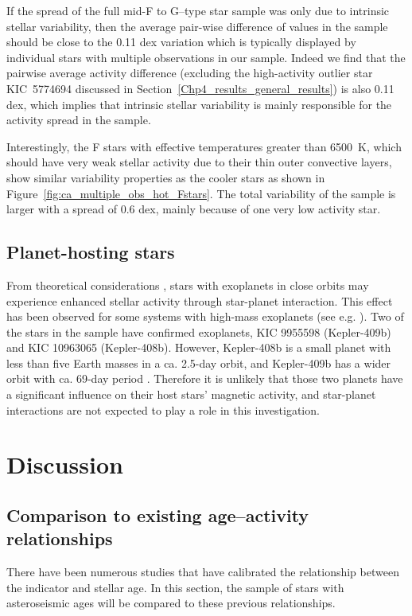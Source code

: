 If the spread of the full mid-F to G--type star sample was only due to intrinsic stellar variability, then the average pair-wise difference of \Rprime values in the sample should be close to the 0.11 dex variation which is typically displayed by individual stars with multiple observations in our sample. Indeed we find that the pairwise average activity difference (excluding the high-activity outlier star KIC~5774694 discussed in Section~\ref{Chp4_results_general_results}) is also 0.11 dex, which implies that intrinsic stellar variability is mainly responsible for the activity spread in the sample.

Interestingly, the F stars with effective temperatures greater than 6500~K, which should have very weak stellar activity due to their thin outer convective layers, show similar variability properties as the cooler stars as shown in Figure~\ref{fig:ca_multiple_obs_hot_Fstars}. The total variability of the sample is larger with a spread of 0.6 dex, mainly because of one very low activity star. 

\subsection{Planet-hosting stars}
From theoretical considerations \citep{Cuntz_etal_2000}, stars with exoplanets in close orbits may experience enhanced stellar activity through star-planet interaction. This effect has been observed for some systems with high-mass exoplanets (see e.g. \citealt{Poppenhaeger_Wolk_2014,Pillitteri_etal_2015}). Two of the stars in the sample have confirmed exoplanets, KIC 9955598 (Kepler-409b) and KIC 10963065 (Kepler-408b). However, Kepler-408b is a small planet with less than five Earth masses in a ca. 2.5-day orbit, and Kepler-409b has a wider orbit with ca. 69-day period \citep{Marcy_etal_2014}. Therefore it is unlikely that those two planets have a significant influence on their host stars' magnetic activity, and star-planet interactions are not expected to play a role in this investigation.

\section{Discussion}
\label{Chp4_discussion}

\subsection{Comparison to existing age--activity relationships}
\label{Chp4_discus_previous_relations}
There have been numerous studies that have calibrated the relationship between the \Rprime indicator and stellar age. In this section, the sample of stars with asteroseismic ages will be compared to these previous relationships.

